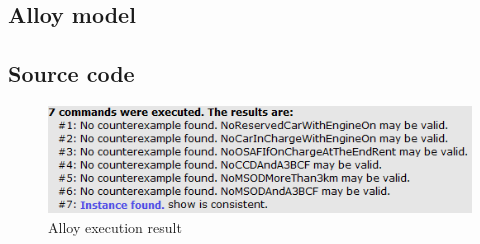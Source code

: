 \begin{appendices}

	\section{Alloy model}
		\subsection{Source code}
		
		\begin{figure}[h!]
			\centering
			\includegraphics[]{alloy/AlloyResult.png}
			\caption{
				\label{fig:alloyExecutionResult} 
				Alloy execution result
			}
		\end{figure}
		\clearpage

\end{appendices}
